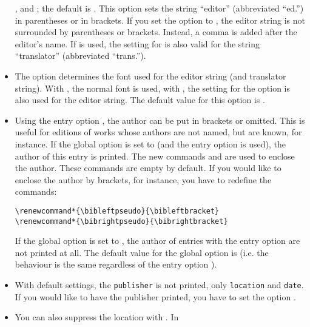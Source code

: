 \documentclass[english]{scrartcl}
\begin{document}
\begin{itemize}
	      ,  and ; the default is
	      . This option sets the string \enquote{editor}
	      (abbreviated \enquote{ed.}) in parentheses or in brackets. If you set 
	      the option to , the editor string is not 
	      surrounded by parentheses or brackets. Instead, a comma is added after 
	      the editor's name.
	      If  is used, the setting for
	       is also valid for the string
	      \enquote{translator} (abbreviated \enquote{trans.}).
	\item The option 
        determines the font used for the editor string (and 
        translator string). With , 
        the normal font is used, with , the setting for the option 
         is also used for the editor string. The default value for this 
        option is .
  \item Using the entry option , the author can be put 
	      in brackets or omitted. This is useful for editions of works whose authors 
				are not named, but are known, for instance. If the global option 
				is set to  (and the entry option  is used), the author of this 
				entry is printed. The new commands  and  
				are used to enclose the author. These commands are empty by default. If you would like to enclose
				the author by brackets, for instance, you have to redefine the commands:
				\begin{lstlisting}
\renewcommand*{\bibleftpseudo}{\bibleftbracket}
\renewcommand*{\bibrightpseudo}{\bibrightbracket}
				\end{lstlisting}
				If the global option 
				 is set to , the author of entries 
				with the entry option  are not printed at 
				all. The default value for the global option is 
				(i.e. the behaviour is the same regardless of the entry 
				option ).
  \item With default settings, the \texttt{publisher} is not printed, only 
        \texttt{location} and \texttt{date}. If you would like to have the
        publisher printed, you have to set the option 
        .
  \item You can also suppress the location with . In 

\end{itemize}
\end{document}
